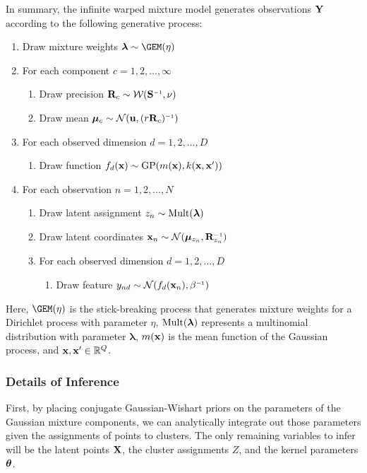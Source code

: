 In summary, the infinite warped mixture model generates observations $\mathbf{Y}$ according to the following generative process:
%
\begin{enumerate}
\item Draw mixture weights $\bm{\lambda} \sim \GEM(\eta)$
\item For each component $c=1, 2, \dots, \infty$
\begin{enumerate}
\item Draw precision $\vR_c \sim {\mathcal W}(\vS\inv, \nu)$
\item Draw mean $\vmu_c \sim {\mathcal N}(\vu,(r\vR_c)\inv)$
\end{enumerate}
\item For each observed dimension $d=1, 2, \dots, D$
\begin{enumerate}
\item Draw function $f_{d}({\bf{x}}) \sim {\rm GP}(m({\bf{x}}),k({\bf{x}},{\bf{x}}'))$
\end{enumerate}
\item For each observation $n=1, 2, \dots,N$
\begin{enumerate}
\item Draw latent assignment $z_n \sim {\rm Mult}(\bm{\lambda})$
\item Draw latent coordinates $\vx_n \sim {\mathcal N}(\vmu_{z_n},\vR_{z_n}\inv)$
\item For each observed dimension $d=1, 2, \dots, D$
\begin{enumerate}
\item Draw feature $y_{nd} \sim {\cal N}(f_d(\vx_n), \beta\inv)$
\end{enumerate}
\end{enumerate}
\end{enumerate}
%
Here, $\GEM(\eta)$ is the stick-breaking process \citep{sethuraman94} that generates mixture weights for a Dirichlet process with parameter $\eta$, %
${\rm Mult}(\bm{\lambda})$ represents a multinomial distribution with parameter $\bm{\lambda}$,
$m({\bf{x}})$ is the mean function of the Gaussian process, and ${\bf{x}},{\bf{x}}'\in{\mathbb R}^{Q}$.



\subsubsection{Details of Inference}
\label{sec:iwmm-inference-details}

First, by placing conjugate Gaussian-Wishart priors on the parameters of the Gaussian mixture components, we can analytically integrate out those parameters given the assignments of points to clusters.
The only remaining variables to infer will be the latent points $\mathbf{X}$, the cluster assignments $Z$, and the kernel parameters ${\boldsymbol{\theta}}$.

